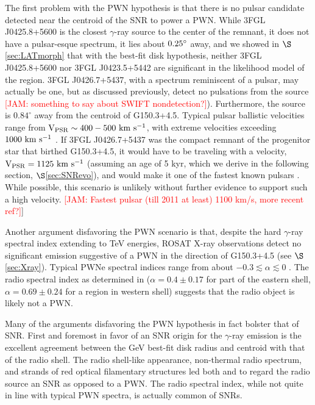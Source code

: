 \documentclass[iop]{emulateapj}
\newcommand{\kibitz}[2]{\ifnum\Comments=1\textcolor{#1}{#2}\fi}
\newcommand{\jamie}[1]{\kibitz{red}      {[JAM: #1]}}
\newcommand{\gam}{$\gamma$-ray}
\newcommand{\Gone}{G150.3+4.5}
\newcommand{\psrLike}{3FGL J0426.7+5437}
\begin{document}
The first problem with the PWN hypothesis is that there is no pulsar candidate detected near the centroid of the SNR to power a PWN. While 3FGL J0425.8+5600 is the closest \gam{} source to the center of the remnant, it does not have a pulsar-esque spectrum, it lies about ${\rm 0.25^\circ }$ away, and we showed in $\S$\ref{sec:LATmorph} that with the best-fit disk hypothesis, neither 3FGL J0425.8+5600 nor 3FGL J0423.5+5442 are significant in the likelihood model of the region. \psrLike{}, with a spectrum reminiscent of a pulsar,  may actually be one, but as discussed previously, \cite{Barr13} detect no pulsations from the source \jamie{something to say about SWIFT nondetection?}). Furthermore, the source is $0.84^\circ$ away from the centroid of \Gone{}. Typical pulsar ballistic velocities range from ${\rm V_{PSR} \sim 400-500~km~s^{-1}}$, with extreme velocities exceeding ${\rm 1000~km~s^{-1}}$ \citep{Gaensler06}. If \psrLike{} was the compact remnant of the progenitor star that birthed \Gone{}, it would have to be traveling with a velocity, ${\rm V_{PSR} = 1125~km~s^{-1}}$ (assuming an age of 5 kyr, which we derive in the following section, $\S$\ref{sec:SNRevo}), and would make it one of the fastest known pulsars \citep{Chatterjee05}. While possible, this scenario is unlikely without further evidence to support such a high velocity. \jamie{Fastest pulsar (till 2011 at least) 1100 km/s, more recent ref?}]

Another argument disfavoring the PWN scenario is that, despite the hard \gam{} spectral index extending to TeV energies, ROSAT X-ray observations detect no significant emission suggestive of a PWN in the direction of \Gone{} (see $\S$\ref{sec:Xray}). Typical PWNe spectral indices range from about $-0.3 \lesssim \alpha  \lesssim  0$ \citep{Gaensler06}. The radio spectral index  as determined in \cite{Gao14}  ($\alpha = 0.4 \pm 0.17$ for part of the eastern shell, $\alpha = 0.69 \pm 0.24$ for a region in western shell) suggests that the radio object is likely not a PWN.
	
Many of the arguments disfavoring the PWN hypothesis in fact bolster that of SNR. First and foremost in favor of an SNR origin for the \gam{} emission is the excellent agreement between the GeV best-fit disk radius and centroid with that of the radio shell.  The radio shell-like appearance, non-thermal radio spectrum, and strands of red optical filamentary structures led both \cite{Gao14} and \cite{Gerbrandt14} to regard the radio source an SNR as opposed to a PWN.  The radio spectral index, while not quite in line with typical PWN spectra, is actually  common of SNRs.
\end{document}
